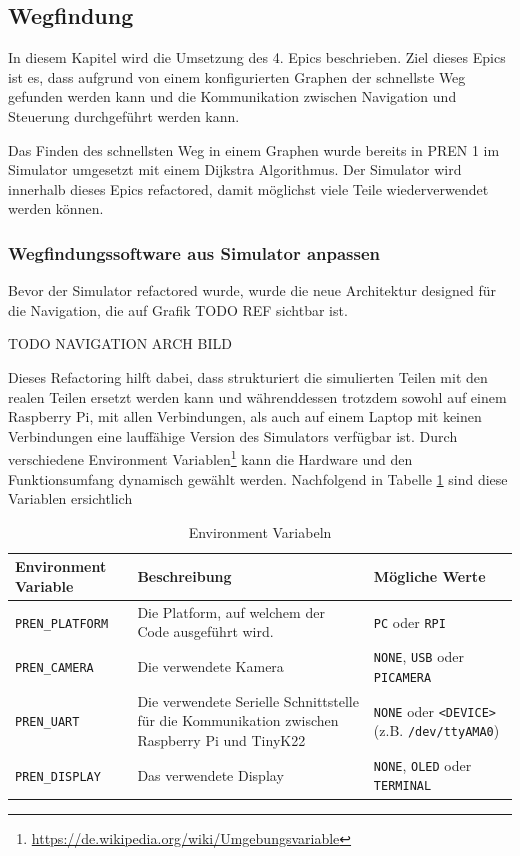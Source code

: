 \subsection{Wegfindung}

In diesem Kapitel wird die Umsetzung des 4. Epics beschrieben. Ziel dieses Epics ist es, dass aufgrund von einem konfigurierten Graphen der schnellste Weg gefunden werden kann und die Kommunikation zwischen Navigation und Steuerung durchgeführt werden kann.

Das Finden des schnellsten Weg in einem Graphen wurde bereits in PREN 1 im Simulator umgesetzt mit einem Dijkstra Algorithmus. Der Simulator wird innerhalb dieses Epics refactored, damit möglichst viele Teile wiederverwendet werden können.

\subsubsection{Wegfindungssoftware aus Simulator anpassen}
\label{navigation-arch}

Bevor der Simulator refactored wurde, wurde die neue Architektur designed für die Navigation, die auf Grafik TODO REF sichtbar ist.

TODO NAVIGATION ARCH BILD

Dieses Refactoring hilft dabei, dass strukturiert die simulierten Teilen mit den realen Teilen ersetzt werden kann und währenddessen trotzdem sowohl auf einem Raspberry Pi, mit allen Verbindungen, als auch auf einem Laptop mit keinen Verbindungen eine lauffähige Version des Simulators verfügbar ist.
Durch verschiedene Environment Variablen\footnote{\url{https://de.wikipedia.org/wiki/Umgebungsvariable}} kann die Hardware und den Funktionsumfang dynamisch gewählt werden. Nachfolgend in Tabelle \ref{table:environment-variables} sind diese Variablen ersichtlich


\begin{table}[H]
    \centering
    \begin{tabularx}{\textwidth}{|X|X|X|}
    \hline
        \textbf{Environment Variable} & \textbf{Beschreibung} & \textbf{Mögliche Werte}\\
        \hline
         \verb|PREN_PLATFORM| & Die Platform, auf welchem der Code ausgeführt wird. & \verb|PC| oder \verb|RPI| \\
         \hline
         \verb|PREN_CAMERA| & Die verwendete Kamera & \verb|NONE|, \verb|USB| oder \verb|PICAMERA| \\
         \hline
         \verb|PREN_UART| & Die verwendete Serielle Schnittstelle für die Kommunikation zwischen Raspberry Pi und TinyK22 & \verb|NONE| oder \verb|<DEVICE>| \newline (z.B. \verb|/dev/ttyAMA0|) \\
         \hline
         \verb|PREN_DISPLAY| & Das verwendete Display &  \verb|NONE|, \verb|OLED| oder \verb|TERMINAL|  \\
         \hline
    \end{tabularx}
    \caption{Environment Variabeln}
    \label{table:environment-variables}
\end{table}

